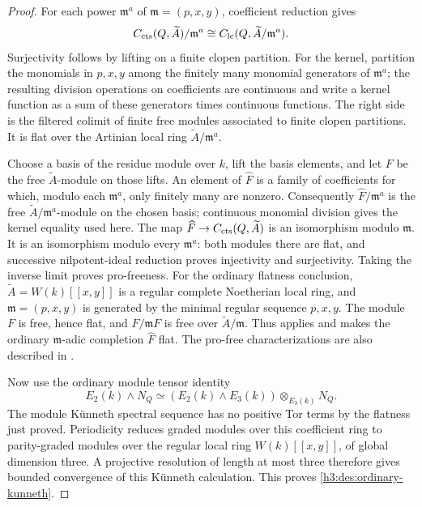 \begin{proof}
For each power \(\mathfrak m^a\) of \(\mathfrak m=(p,x,y)\),
coefficient reduction gives
\[
 C_{\mathrm{cts}}(Q,\widetilde A)/\mathfrak m^a
 \cong C_{\mathrm{lc}}(Q,\widetilde A/\mathfrak m^a).
\]
Surjectivity follows by lifting on a finite clopen partition.
For the kernel, partition the monomials in \(p,x,y\) among the
finitely many monomial generators of \(\mathfrak m^a\); the resulting
division operations on coefficients are continuous and write a
kernel function as a sum of these generators times continuous
functions.  The right side is the filtered colimit of finite free
modules associated to finite clopen partitions.  It is flat over
the Artinian local ring \(\widetilde A/\mathfrak m^a\).

Choose a basis of the residue module over \(k\), lift the basis
elements, and let \(F\) be the free \(\widetilde A\)-module on those
lifts.  An element of \(\widehat F\) is a family of coefficients for which,
modulo each \(\mathfrak m^a\), only finitely many are nonzero.
Consequently \(\widehat F/\mathfrak m^a\) is the free
\(\widetilde A/\mathfrak m^a\)-module on the chosen basis; continuous
monomial division gives the kernel equality used here.  The map
\(\widehat F\to C_{\mathrm{cts}}(Q,\widetilde A)\) is an isomorphism
modulo \(\mathfrak m\).  It is an isomorphism modulo every
\(\mathfrak m^a\): both modules there are flat, and successive
nilpotent-ideal reduction proves injectivity and surjectivity.
Taking the inverse limit proves pro-freeness.  For the ordinary
flatness conclusion, \(\widetilde A=W(k)[[x,y]]\) is a regular complete
Noetherian local ring, and \(\mathfrak m=(p,x,y)\) is generated by the
minimal regular sequence \(p,x,y\).  The module \(F\) is free, hence
flat, and \(F/\mathfrak mF\) is free over \(\widetilde A/\mathfrak m\).
Thus \cite[Proposition~3.13]{BarthelStapleton2016} applies and makes the
ordinary \(\mathfrak m\)-adic completion \(\widehat F\) flat.  The
pro-free characterizations are also described in
\cite[Theorem~A.9 and Proposition~A.13]{HS99}.

Now use the ordinary module tensor identity
\[
 E_2(k)\wedge N_Q
 \simeq
 (E_2(k)\wedge E_3(k))\otimes_{E_3(k)}N_Q.
\]
The module Künneth spectral sequence has no positive Tor terms
by the flatness just proved.  Periodicity reduces graded modules over this coefficient ring to
parity-graded modules over the regular local ring
\(W(k)[[x,y]]\), of global dimension three.  A projective resolution
of length at most three therefore gives bounded convergence of this
Künneth calculation.
This proves \eqref{h3:des:ordinary-kunneth}.
\end{proof}

